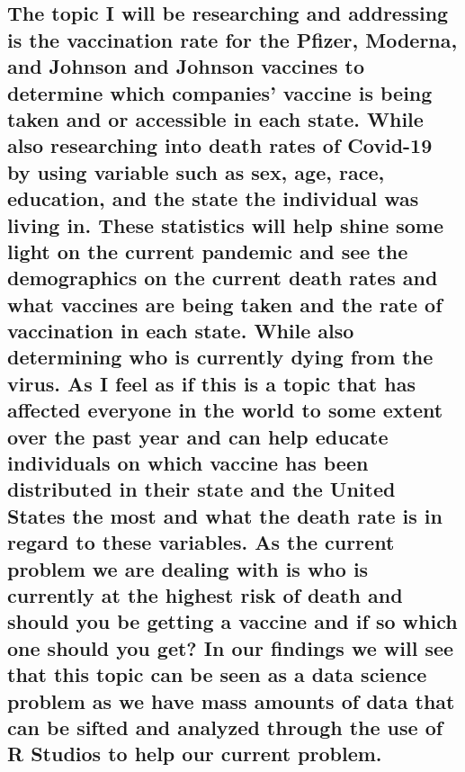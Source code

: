\documentclass[
]{article}
\begin{document}
{\subsection{The topic I will be researching and addressing is the
vaccination rate for the Pfizer, Moderna, and Johnson and Johnson
vaccines to determine which companies' vaccine is being taken and or
accessible in each state. While also researching into death rates of
Covid-19 by using variable such as sex, age, race, education, and the
state the individual was living in. These statistics will help shine
some light on the current pandemic and see the demographics on the
current death rates and what vaccines are being taken and the rate of
vaccination in each state. While also determining who is currently dying
from the virus. As I feel as if this is a topic that has affected
everyone in the world to some extent over the past year and can help
educate individuals on which vaccine has been distributed in their state
and the United States the most and what the death rate is in regard to
these variables. As the current problem we are dealing with is who is
currently at the highest risk of death and should you be getting a
vaccine and if so which one should you get? In our findings we will see
that this topic can be seen as a data science problem as we have mass
amounts of data that can be sifted and analyzed through the use of R
Studios to help our current
problem.}\label{the-topic-i-will-be-researching-and-addressing-is-the-vaccination-rate-for-the-pfizer-moderna-and-johnson-and-johnson-vaccines-to-determine-which-companies-vaccine-is-being-taken-and-or-accessible-in-each-state.-while-also-researching-into-death-rates-of-covid-19-by-using-variable-such-as-sex-age-race-education-and-the-state-the-individual-was-living-in.-these-statistics-will-help-shine-some-light-on-the-current-pandemic-and-see-the-demographics-on-the-current-death-rates-and-what-vaccines-are-being-taken-and-the-rate-of-vaccination-in-each-state.-while-also-determining-who-is-currently-dying-from-the-virus.-as-i-feel-as-if-this-is-a-topic-that-has-affected-everyone-in-the-world-to-some-extent-over-the-past-year-and-can-help-educate-individuals-on-which-vaccine-has-been-distributed-in-their-state-and-the-united-states-the-most-and-what-the-death-rate-is-in-regard-to-these-variables.-as-the-current-problem-we-are-dealing-with-is-who-is-currently-at-the-highest-risk-of-death-and-should-you-be-getting-a-vaccine-and-if-so-which-one-should-you-get-in-our-findings-we-will-see-that-this-topic-can-be-seen-as-a-data-science-problem-as-we-have-mass-amounts-of-data-that-can-be-sifted-and-analyzed-through-the-use-of-r-studios-to-help-our-current-problem.}}
\end{document}
